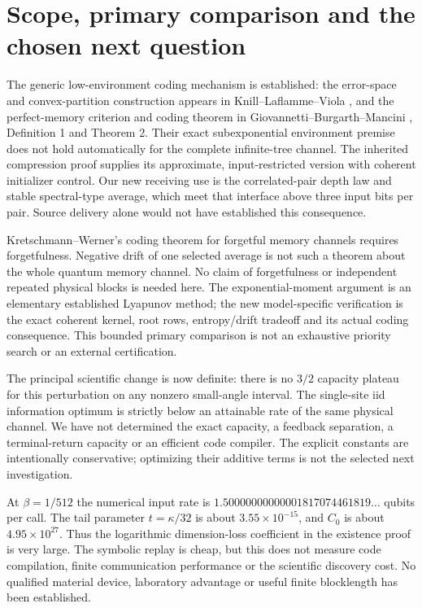 \documentclass[11pt]{article}
\begin{document}
\section{Scope, primary comparison and the chosen next question}

The generic low-environment coding mechanism is established: the error-space
and convex-partition construction appears in Knill--Laflamme--Viola
\cite{KLV}, and the perfect-memory criterion and coding theorem in
Giovannetti--Burgarth--Mancini \cite{GBM}, Definition 1 and Theorem 2.
Their exact subexponential environment premise does not hold automatically
for the complete infinite-tree channel. The inherited compression proof
supplies its approximate, input-restricted version with coherent initializer
control. Our new receiving use is the correlated-pair depth law and stable
spectral-type average, which meet that interface above three input bits per
pair. Source delivery alone would not have established this consequence.

Kretschmann--Werner's coding theorem for forgetful memory channels
\cite{KW} requires forgetfulness. Negative drift of one selected average is
not such a theorem about the whole quantum memory channel. No claim of
forgetfulness or independent repeated physical blocks is needed here.
The exponential-moment argument is an elementary established Lyapunov method;
the new model-specific verification is the exact coherent kernel, root rows,
entropy/drift tradeoff and its actual coding consequence. This bounded primary
comparison is not an exhaustive priority search or an external certification.

The principal scientific change is now definite: there is no $3/2$ capacity
plateau for this perturbation on any nonzero small-angle interval. The
single-site iid information optimum is strictly below an attainable rate of
the same physical channel. We have not determined the exact capacity, a
feedback separation, a terminal-return capacity or an efficient code compiler.
The explicit constants are intentionally conservative; optimizing their
additive terms is not the selected next investigation.

At $\beta=1/512$ the numerical input rate is
$1.50000000000001817074461819\ldots$ qubits per call. The tail parameter
$t=\kappa/32$ is about $3.55\times10^{-15}$, and $C_0$ is about
$4.95\times10^{27}$. Thus the logarithmic dimension-loss coefficient in
the existence proof is very large. The symbolic replay is cheap, but this
does not measure code compilation, finite communication performance or the
scientific discovery cost. No qualified material device, laboratory advantage
or useful finite blocklength has been established.
\end{document}
